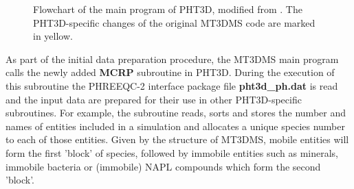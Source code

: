 \begin{figure}
\begin{center}
\end{center}
\caption[Flowchart of the main program of PHT3D]{Flowchart of the main
program of PHT3D, modified from \citep[]{zheng99}.
The PHT3D-specific changes of the original MT3DMS code are marked in yellow.}
\label{fig_pht3d_flowchart_a}
\end{figure}

As part of the initial data preparation procedure, the MT3DMS main
program calls the newly added \textbf{MCRP} subroutine in PHT3D.
During the execution of this subroutine the PHREEQC-2 interface
package file {\color{red} \textbf{pht3d\_ph.dat}} is read and the
input data are prepared for their use in other PHT3D-specific
subroutines. For example, the subroutine reads, sorts and stores
the number and names of entities included in a simulation and
allocates a unique species number to each of those entities. Given
by the structure of MT3DMS, mobile entities will form the first
'block' of species, followed by immobile entities such as
minerals, immobile bacteria or (immobile) NAPL compounds which
form the second 'block'.

